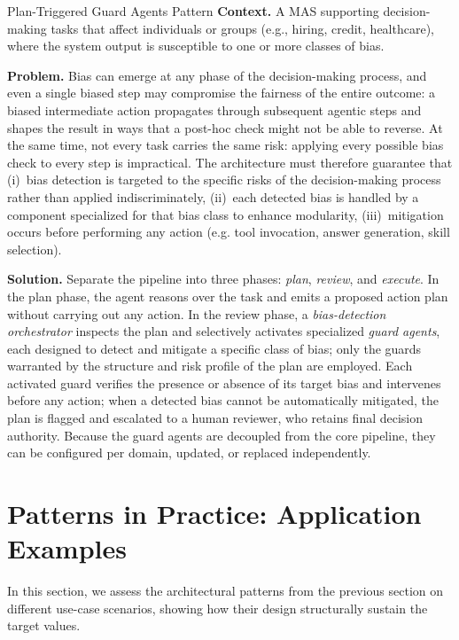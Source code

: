 \documentclass[sigconf,nonacm]{acmart}
\begin{document}
\begin{discussionbox}{Plan-Triggered Guard Agents Pattern}
\textbf{Context.} A MAS supporting decision-making tasks that affect
individuals or groups (e.g., hiring, credit, healthcare), where the
system output is susceptible to one or more classes of bias.

\textbf{Problem.} Bias can emerge at any phase of the
decision-making process, and even a single biased step may
compromise the fairness of the entire outcome: a biased intermediate
action propagates through subsequent agentic steps and shapes the
result in ways that a post-hoc check might not be able to reverse.
At the same time, not every task carries the same risk: applying every possible bias check to every step is impractical. The architecture must therefore guarantee that (i)~bias detection is targeted to the specific risks of the decision-making process rather than applied indiscriminately, (ii)~each detected bias is handled by a component specialized for that bias class to enhance modularity, (iii)~mitigation occurs before performing any action (e.g. tool invocation, answer generation, skill selection).

\textbf{Solution.} Separate the pipeline into three phases:
\textit{plan}, \textit{review}, and \textit{execute}. In the plan phase,
the agent reasons over the task and emits a proposed action plan without carrying out any action. In the review phase, a
\textit{bias-detection orchestrator} inspects the plan and selectively
activates specialized \textit{guard agents}, each designed to detect
and mitigate a specific class of bias; only the guards warranted by
the structure and risk profile of the plan are employed. Each
activated guard verifies the presence or absence of its target bias and intervenes before any action; when a detected bias cannot be automatically mitigated, the
plan is flagged and escalated to a human reviewer, who retains final decision authority. Because the guard agents are decoupled from the
core pipeline, they can be configured per domain, updated, or replaced independently.
\end{discussionbox}

\section{Patterns in Practice: Application Examples}
\label{sec:use-cases}
In this section, we assess the architectural patterns from the previous section on different use-case scenarios, showing how their design structurally sustain the target values.
\end{document}
